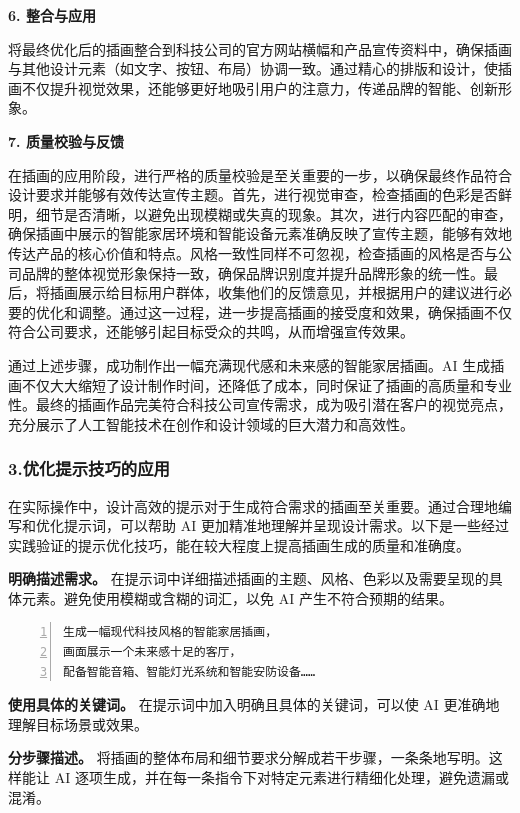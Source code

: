 \textbf{6. 整合与应用}

将最终优化后的插画整合到科技公司的官方网站横幅和产品宣传资料中，确保插画与其他设计元素（如文字、按钮、布局）协调一致。通过精心的排版和设计，使插画不仅提升视觉效果，还能够更好地吸引用户的注意力，传递品牌的智能、创新形象。

\textbf{7. 质量校验与反馈}

在插画的应用阶段，进行严格的质量校验是至关重要的一步，以确保最终作品符合设计要求并能够有效传达宣传主题。首先，进行视觉审查，检查插画的色彩是否鲜明，细节是否清晰，以避免出现模糊或失真的现象。其次，进行内容匹配的审查，确保插画中展示的智能家居环境和智能设备元素准确反映了宣传主题，能够有效地传达产品的核心价值和特点。风格一致性同样不可忽视，检查插画的风格是否与公司品牌的整体视觉形象保持一致，确保品牌识别度并提升品牌形象的统一性。最后，将插画展示给目标用户群体，收集他们的反馈意见，并根据用户的建议进行必要的优化和调整。通过这一过程，进一步提高插画的接受度和效果，确保插画不仅符合公司要求，还能够引起目标受众的共鸣，从而增强宣传效果。

通过上述步骤，成功制作出一幅充满现代感和未来感的智能家居插画。AI 生成插画不仅大大缩短了设计制作时间，还降低了成本，同时保证了插画的高质量和专业性。最终的插画作品完美符合科技公司宣传需求，成为吸引潜在客户的视觉亮点，充分展示了人工智能技术在创作和设计领域的巨大潜力和高效性。

\subsubsection{3.优化提示技巧的应用}

在实际操作中，设计高效的提示对于生成符合需求的插画至关重要。通过合理地编写和优化提示词，可以帮助 AI 更加精准地理解并呈现设计需求。以下是一些经过实践验证的提示优化技巧，能在较大程度上提高插画生成的质量和准确度。

\textbf{明确描述需求。} 在提示词中详细描述插画的主题、风格、色彩以及需要呈现的具体元素。避免使用模糊或含糊的词汇，以免 AI 产生不符合预期的结果。

\begin{lstlisting}[language={python}, label={}, caption={}, basicstyle=\footnotesize\ttfamily, breaklines=true, numbers=left, frame=single]
生成一幅现代科技风格的智能家居插画，
画面展示一个未来感十足的客厅，
配备智能音箱、智能灯光系统和智能安防设备……
\end{lstlisting}

\textbf{使用具体的关键词。} 在提示词中加入明确且具体的关键词，可以使 AI 更准确地理解目标场景或效果。

\textbf{分步骤描述。} 将插画的整体布局和细节要求分解成若干步骤，一条条地写明。这样能让 AI 逐项生成，并在每一条指令下对特定元素进行精细化处理，避免遗漏或混淆。

